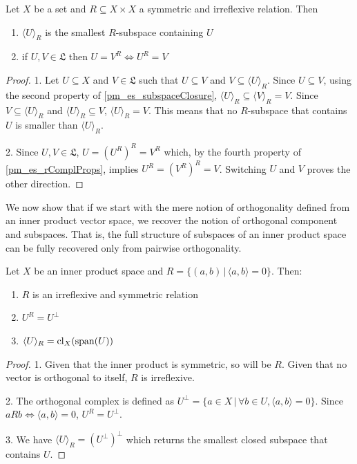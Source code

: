 \begin{mathSection}
	\begin{prop}
		Let $X$ be a set and $R \subseteq X \times X$ a symmetric and irreflexive relation. Then
		\begin{enumerate}
			\item $\langle U \rangle_R$ is the smallest $R$-subspace containing $U$
			\item if $U, V \in \mathfrak{L}$ then $U = V^{R} \iff U^{R} = V$
		\end{enumerate}
	\end{prop}
	
	\begin{proof}
		1. Let $U \subseteq X$ and $V \in \mathfrak{L}$ such that $U \subseteq V$ and $V \subseteq \langle U \rangle_R$. Since $U \subseteq V$, using the second property of \ref{pm_es_subspaceClosure}, $\langle U \rangle_R \subseteq \langle V \rangle_R = V$. Since $V \subseteq \langle U \rangle_R$ and  $\langle U \rangle_R \subseteq  V$, $\langle U \rangle_R = V$. This means that no $R$-subspace that contains $U$ is smaller than $\langle U \rangle_R$.
		
		2. Since $U, V \in \mathfrak{L}$, $U = (U^{R})^{R} = V^{R}$ which, by the fourth property of \ref{pm_es_rComplProps}, implies $U^{R} = (V^{R})^{R} = V$. Switching $U$ and $V$ proves the other direction.
	\end{proof}
\end{mathSection}

We now show that if we start with the mere notion of orthogonality defined from an inner product vector space, we recover the notion of orthogonal component and subspaces. That is, the full structure of subspaces of an inner product space can be fully recovered only from pairwise orthogonality.

\begin{mathSection}
	\begin{prop}
		Let $X$ be an inner product space and $R = \{(a,b) \,|\, \langle a , b\rangle = 0\}$. Then:
		\begin{enumerate}
			\item $R$ is an irreflexive and symmetric relation
			\item $U^{R} = U^{\perp}$
			\item $\langle U \rangle_R = \mathrm{cl}_X (\mathrm{span}(U))$
		\end{enumerate}
	\end{prop}
	
	\begin{proof}
		1. Given that the inner product is symmetric, so will be $R$. Given that no vector is orthogonal to itself, $R$ is irreflexive.
		
		2. The orthogonal complex is defined as $U^\perp = \{ a \in X \, | \, \forall b \in U, \langle a , b\rangle = 0 \}$. Since $aRb \iff \langle a , b\rangle = 0$, $U^{R} = U^{\perp}$.
		
		3. We have $\langle U \rangle_R = (U^{\perp})^\perp$ which returns the smallest closed subspace that contains $U$.
	\end{proof}
\end{mathSection}

